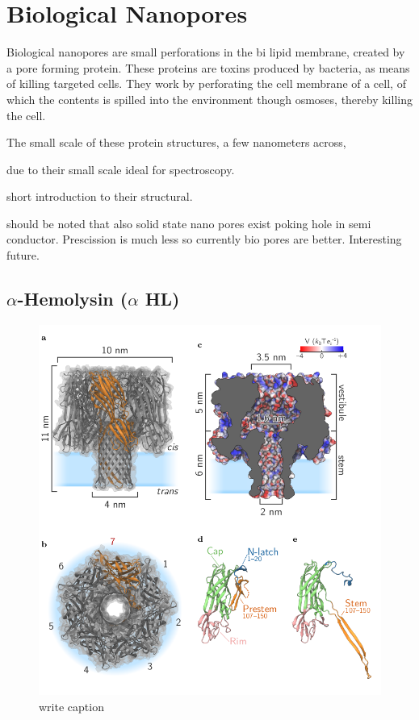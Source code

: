 \section{Biological Nanopores}

Biological nanopores are small perforations in the bi lipid membrane, created by a pore
forming protein.  These proteins are toxins
produced by bacteria, as means of killing targeted cells. They work by perforating
the cell membrane of a cell, of which the contents is spilled into the
environment though osmoses, thereby killing the cell.

The small scale of these protein structures, a few nanometers across,


due to their small scale ideal for spectroscopy.

short introduction to their structural.

should be noted that also solid state nano pores exist poking hole in semi conductor.
Prescission is much less so currently bio pores are better. Interesting future.


\subsection{$\alpha$-Hemolysin ($\alpha$ HL)}
\begin{figure}[h!]
  \centering
  \includegraphics[width=0.5\linewidth]{Figures/alpha-hemolysin.png}
  \caption{write caption}
  \label{adsf}
\end{figure}


